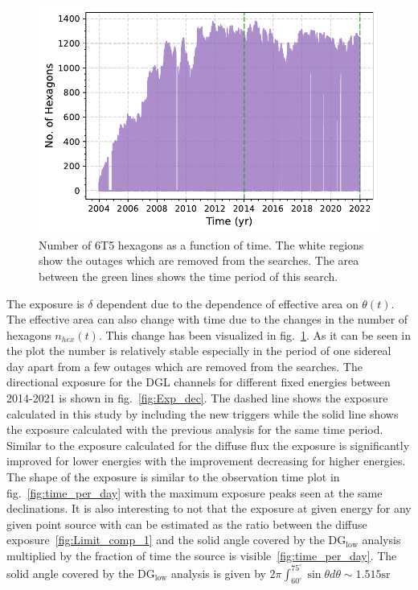 \begin{figure}[t!]
  \centering
  \includegraphics[width=\textwidth]{thesis_figures/PointLimits/Hexagons_2004_2021_forSrijan.pdf}
  \caption{Number of 6T5 hexagons as a function of time. The white regions show the outages which are removed from the searches. The area between the green lines shows the time period of this search.}
  \label{fig:Hexagon_time}
\end{figure}

The exposure is $\delta$ dependent due to the dependence of effective area on $\theta(t)$. The effective area can also change with time due to the changes in the number of hexagons $n_{hex}(t)$. This change has been visualized in fig.~\ref{fig:Hexagon_time}. As it can be seen in the plot the number is relatively stable especially in the period of one sidereal day apart from a few outages which are removed from the searches. The directional exposure for the DGL channels for different fixed energies between 2014-2021 is shown in fig.~\ref{fig:Exp_dec}. The dashed line shows the exposure calculated in this study by including the new triggers while the solid line shows the exposure calculated with the previous analysis for the same time period. Similar to the exposure calculated for the diffuse flux the exposure is significantly improved for lower energies with the improvement decreasing for higher energies. The shape of the exposure is similar to the observation time plot in fig.~\ref{fig:time_per_day} with the maximum exposure peaks seen at the same declinations. It is also interesting to not that the exposure at given energy for any given point source with  can be estimated as the ratio between the diffuse exposure~\ref{fig:Limit_comp_1} and the solid angle covered by the DG$_{\text{low}}$ analysis multiplied by the fraction of time the source is visible~\ref{fig:time_per_day}. The solid angle covered by the DG$_{\text{low}}$ analysis is given by $2\pi \int_{60^{\circ}}^{75^{\circ}} \sin \theta d \theta \sim 1.515 \text{sr} $

